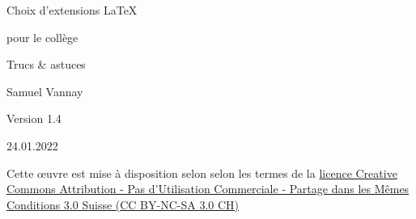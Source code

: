 
\begin{titlepage}
	\begin{center}
		\vspace*{3cm}
		
		\Huge{
			Choix d'extensions \LaTeX
			
			pour le collège
		}

		\vspace*{3cm}
		
		\Huge{
			Trucs \& astuces
		}
		
		\vspace{12cm}
		
		\small{
			Samuel Vannay
			
			Version 1.4
			
			24.01.2022
			
			\ccLogo \ccAttribution \ccNonCommercialEU \ccShareAlike
		}
	\end{center}

\end{titlepage}
 






\tableofcontents

\vfill

Cette {\oe}uvre est mise à disposition selon selon les termes de la \href{http://creativecommons.org/licenses/by-nc-sa/3.0/ch/deed.fr}{licence Creative Commons Attribution - Pas d'Utilisation Commerciale - Partage dans les Mêmes Conditions 3.0 Suisse (CC BY-NC-SA 3.0 CH)}